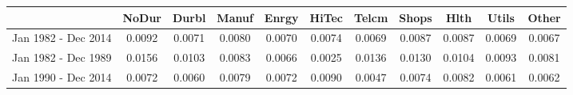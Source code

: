 \begin{tabular}{ccccccccccc}
  \hline
 & NoDur & Durbl & Manuf & Enrgy & HiTec & Telcm & Shops & Hlth & Utils & Other \\ 
  \hline
Jan 1982 - Dec 2014 & 0.0092 & 0.0071 & 0.0080 & 0.0070 & 0.0074 & 0.0069 & 0.0087 & 0.0087 & 0.0069 & 0.0067 \\ 
  Jan 1982 - Dec 1989 & 0.0156 & 0.0103 & 0.0083 & 0.0066 & 0.0025 & 0.0136 & 0.0130 & 0.0104 & 0.0093 & 0.0081 \\ 
  Jan 1990 - Dec 2014 & 0.0072 & 0.0060 & 0.0079 & 0.0072 & 0.0090 & 0.0047 & 0.0074 & 0.0082 & 0.0061 & 0.0062 \\ 
   \hline
\end{tabular}
